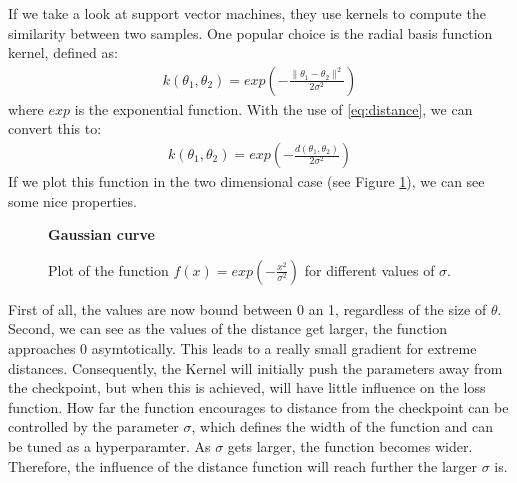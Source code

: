 If we take a look at support vector machines, they use kernels to compute the
similarity between two samples. One popular choice is the radial basis function
kernel, defined as:
\begin{align}\label{eq:RBF}
    k(\theta_1, \theta_2)=exp(-\frac{\rVert \theta_1 - \theta_2 \lVert^2}{2\sigma^2})
\end{align}
where $exp$ is the exponential function. With the use of \ref{eq:distance}, we
can convert this to:
\begin{align}\label{eq:DistanceFinal}
    k(\theta_1, \theta_2)=exp(-\frac{d(\theta_1, \theta_2)}{2\sigma^2})
\end{align}
If we plot this function in the two dimensional case (see Figure
\ref{fig:Gaussian}), we can see some nice properties.
\begin{figure}[h]\label{fig:Gaussian}
    \centering
    \textbf{Gaussian curve}\par\medskip
    \begin{center}
         \caption{Plot of the function $f(x)=exp(-\frac{x^2}{\sigma^2})$ for different values of $\sigma$.}
    \end{center}
\end{figure}
First of all, the values are now bound between 0 an 1, regardless of the size of
$\theta$. Second, we can see as the values of the distance get larger, the
function approaches 0 asymtotically. This leads to a really small gradient for
extreme distances. Consequently, the Kernel will initially push the parameters
away from the checkpoint, but when this is achieved, will have little influence
on the loss function. How far the function encourages to distance from the
checkpoint can be controlled by the parameter $\sigma$, which defines the width
of the function and can be tuned as a hyperparamter. As $\sigma$ gets larger,
the function becomes wider. Therefore, the influence of the distance function
will reach further the larger $\sigma$ is.



